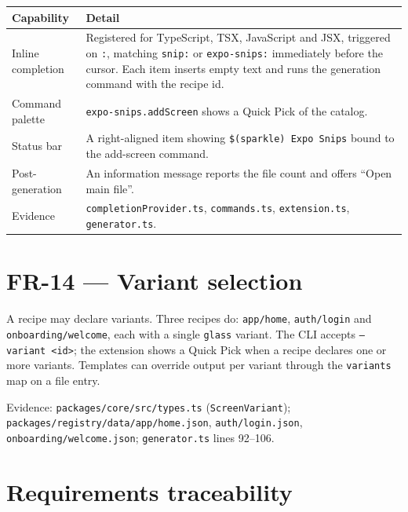 \begin{longtable}{p{3.6cm}p{10.4cm}}
\toprule
\textbf{Capability} & \textbf{Detail} \\
\midrule
\endhead
Inline completion & Registered for TypeScript, TSX, JavaScript and JSX, triggered on
\texttt{:}, matching \texttt{snip:} or \texttt{expo-snips:} immediately before the
cursor. Each item inserts empty text and runs the generation command with the
recipe id. \\
Command palette & \texttt{expo-snips.addScreen} shows a Quick Pick of the catalog. \\
Status bar & A right-aligned item showing \texttt{\$(sparkle) Expo Snips} bound to
the add-screen command. \\
Post-generation & An information message reports the file count and offers
``Open main file''. \\
Evidence & \texttt{completionProvider.ts}, \texttt{commands.ts},
\texttt{extension.ts}, \texttt{generator.ts}. \\
\bottomrule
\end{longtable}

\section{FR-14 --- Variant selection}

A recipe may declare variants. Three recipes do:
\texttt{app/home}, \texttt{auth/login} and \texttt{onboarding/welcome}, each with a
single \texttt{glass} variant. The CLI accepts \texttt{--variant <id>}; the
extension shows a Quick Pick when a recipe declares one or more variants.
Templates can override output per variant through the \texttt{variants} map on a
file entry.

Evidence: \texttt{packages/core/src/types.ts} (\texttt{ScreenVariant});
\texttt{packages/registry/data/app/home.json}, \texttt{auth/login.json},
\texttt{onboarding/welcome.json}; \texttt{generator.ts} lines 92--106.

\section{Requirements traceability}


